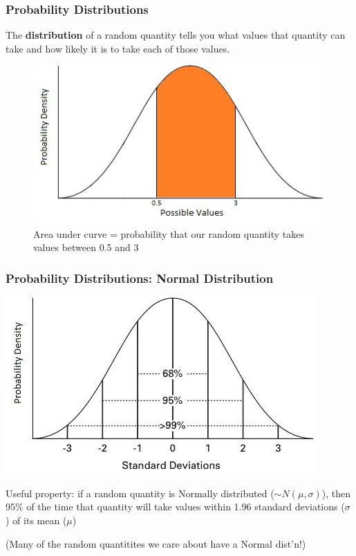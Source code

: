 \documentclass[12pt, 
hyperref={colorlinks=true, linkcolor=blue, urlcolor=cyan}]{beamer}
\begin{document}
\begin{frame}
\frametitle{Probability Distributions}

The \textbf{distribution} of a random quantity tells you what values that quantity can take and how likely it is to take each of those values.

\begin{figure}
\includegraphics[height=0.4\textheight]{./normal-density}
\caption{\color{orange} Area under curve \color{black}= probability that our random quantity takes values between 0.5 and 3}
\end{figure}

\end{frame}

\begin{frame}
\frametitle{Probability Distributions: Normal Distribution}

\begin{center} \includegraphics[height=0.4\textheight]{./Normal} \end{center}

\vspace{-0.3cm} \color{blue} Useful property: \color{black} if a random quantity is Normally distributed ($\sim N(\mu,\sigma)$), then 95\% of the time that quantity will take values within 1.96 standard deviations ($\sigma$) of its mean ($\mu$)

\begin{footnotesize} \color{blue} (Many of the random quantitites we care about have a Normal dist'n!) \color{black} \\ \end{footnotesize}

\end{frame}
\end{document}
